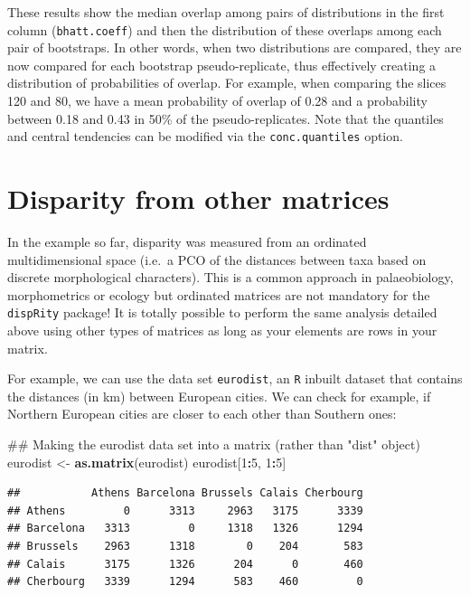 \documentclass[]{book}
\newenvironment{Shaded}{\begin{snugshade}}{\end{snugshade}}
\newcommand{\KeywordTok}[1]{\textcolor[rgb]{0.13,0.29,0.53}{\textbf{#1}}}
\newcommand{\DecValTok}[1]{\textcolor[rgb]{0.00,0.00,0.81}{#1}}
\newcommand{\StringTok}[1]{\textcolor[rgb]{0.31,0.60,0.02}{#1}}
\newcommand{\OperatorTok}[1]{\textcolor[rgb]{0.81,0.36,0.00}{\textbf{#1}}}
\newcommand{\NormalTok}[1]{#1}
\theoremstyle{definition}
\theoremstyle{definition}
\theoremstyle{definition}
\theoremstyle{remark}
\begin{document}
These results show the median overlap among pairs of distributions in
the first column (\texttt{bhatt.coeff}) and then the distribution of
these overlaps among each pair of bootstraps. In other words, when two
distributions are compared, they are now compared for each bootstrap
pseudo-replicate, thus effectively creating a distribution of
probabilities of overlap. For example, when comparing the slices 120 and
80, we have a mean probability of overlap of 0.28 and a probability
between 0.18 and 0.43 in 50\% of the pseudo-replicates. Note that the
quantiles and central tendencies can be modified via the
\texttt{conc.quantiles} option.

\section{Disparity from other
matrices}\label{disparity-from-other-matrices}

In the example so far, disparity was measured from an ordinated
multidimensional space (i.e.~a PCO of the distances between taxa based
on discrete morphological characters). This is a common approach in
palaeobiology, morphometrics or ecology but ordinated matrices are not
mandatory for the \texttt{dispRity} package! It is totally possible to
perform the same analysis detailed above using other types of matrices
as long as your elements are rows in your matrix.

For example, we can use the data set \texttt{eurodist}, an \texttt{R}
inbuilt dataset that contains the distances (in km) between European
cities. We can check for example, if Northern European cities are closer
to each other than Southern ones:

\begin{Shaded}
\begin{Highlighting}[]
\NormalTok{## Making the eurodist data set into a matrix (rather than "dist" object)}
\NormalTok{eurodist <-}\StringTok{ }\KeywordTok{as.matrix}\NormalTok{(eurodist)}
\NormalTok{eurodist[}\DecValTok{1}\OperatorTok{:}\DecValTok{5}\NormalTok{, }\DecValTok{1}\OperatorTok{:}\DecValTok{5}\NormalTok{]}
\end{Highlighting}
\end{Shaded}

\begin{verbatim}
##           Athens Barcelona Brussels Calais Cherbourg
## Athens         0      3313     2963   3175      3339
## Barcelona   3313         0     1318   1326      1294
## Brussels    2963      1318        0    204       583
## Calais      3175      1326      204      0       460
## Cherbourg   3339      1294      583    460         0
\end{verbatim}
\end{document}
